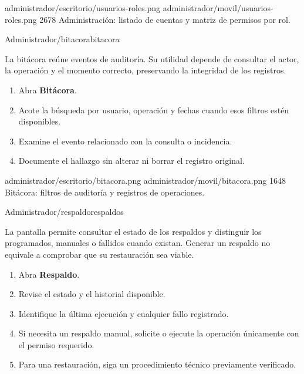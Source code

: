 \documentclass[11pt,a4paper]{article}
\begin{document}


\Pantallas
{administrador/escritorio/usuarios-roles.png}
{administrador/movil/usuarios-roles.png}
{2678}
{Administración: listado de cuentas
y matriz de permisos por rol.}


{Administrador}{/bitacora}{bitacora}

La bitácora reúne eventos de auditoría. Su utilidad
depende de consultar el actor, la operación y el
momento correcto, preservando la integridad de los registros.

\pasos
\begin{enumerate}
\item Abra \textbf{Bitácora}.
\item Acote la búsqueda por usuario, operación y fechas
cuando esos filtros estén disponibles.
\item Examine el evento relacionado con la consulta
o incidencia.
\item Documente el hallazgo sin alterar ni borrar
el registro original.
\end{enumerate}


\Pantallas
{administrador/escritorio/bitacora.png}
{administrador/movil/bitacora.png}
{1648}
{Bitácora: filtros de auditoría
y registros de operaciones.}


{Administrador}{/respaldo}{respaldos}

La pantalla permite consultar el estado de los respaldos
y distinguir los programados, manuales o fallidos cuando
existan. Generar un respaldo no equivale a comprobar que
su restauración sea viable.

\pasos
\begin{enumerate}
\item Abra \textbf{Respaldo}.
\item Revise el estado y el historial disponible.
\item Identifique la última ejecución y cualquier
fallo registrado.
\item Si necesita un respaldo manual, solicite o ejecute
la operación únicamente con el permiso requerido.
\item Para una restauración, siga un procedimiento
técnico previamente verificado.
\end{enumerate}
\end{document}
